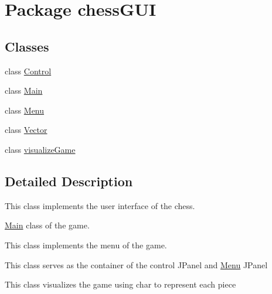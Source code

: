\hypertarget{namespacechess_g_u_i}{}\section{Package chess\+G\+UI}
\label{namespacechess_g_u_i}
\subsection*{Classes}
\begin{DoxyCompactItemize}
\item 
class \hyperlink{classchess_g_u_i_1_1_control}{Control}
\item 
class \hyperlink{classchess_g_u_i_1_1_main}{Main}
\item 
class \hyperlink{classchess_g_u_i_1_1_menu}{Menu}
\item 
class \hyperlink{classchess_g_u_i_1_1_vector}{Vector}
\item 
class \hyperlink{classchess_g_u_i_1_1visualize_game}{visualize\+Game}
\end{DoxyCompactItemize}


\subsection{Detailed Description}
This class implements the user interface of the chess.

\hyperlink{classchess_g_u_i_1_1_main}{Main} class of the game.

This class implements the menu of the game.

This class serves as the container of the control J\+Panel and \hyperlink{classchess_g_u_i_1_1_menu}{Menu} J\+Panel

This class visualizes the game using char to represent each piece 